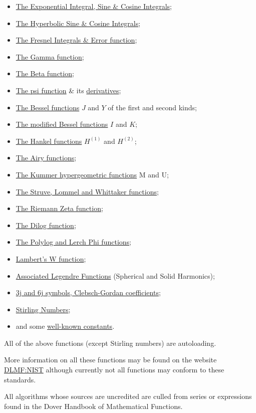 \begin{itemize}
\item \hyperlink{INTEGF}{The Exponential Integral, Sine \& Cosine Integrals};
\item \hyperlink{INTEGF}{The Hyperbolic Sine \& Cosine Integrals};
\item \hyperlink{INTEGF}{The Fresnel Integrals \& Error function};
\item \hyperlink{GAMMF}{The Gamma function};
\item \hyperlink{BETAF}{The Beta function};
\item \hyperlink{DIGAM}{The psi function} \& its \hyperlink{POLYGAM}{derivatives};
\item \hyperlink{BESSELF}{The Bessel functions} $J$ and $Y$ of the first and second kinds;
\item \hyperlink{BESSELF}{The modified Bessel functions} $I$ and $K$;
\item \hyperlink{BESSELF}{The Hankel functions} $H^{(1)}$ and $H^{(2)}$;
\item \hyperlink{AIRYF}{The Airy functions};
\item \hyperlink{HYPERGEOM}{The Kummer hypergeometric functions} M and U;
\item \hyperlink{HYPERGEOM}{The Struve, Lommel and Whittaker functions};
\item \hyperlink{RIEMZETA}{The Riemann Zeta function};
\item \hyperlink{POLYLOG}{The Dilog function};
\item \hyperlink{POLYLOG}{The Polylog and Lerch Phi functions};
\item \hyperlink{LAMBERTW}{Lambert's W function};
\item \hyperlink{SPHSOLH}{Associated Legendre Functions}
(Spherical and Solid Harmonics);
\item \hyperlink{CLEBSCHG}{3j and 6j symbols, Clebsch-Gordan coefficients};
\item \hyperlink{STIRL}{Stirling Numbers};
\item and some \hyperlink{CONSTS}{well-known constants}.
\end{itemize}

All of the above functions (except Stirling numbers) are autoloading.

More information on all these functions may be found on the website
\href{https://dlmf.nist.gov/}{DLMF:NIST} although currently not all functions
may conform to these standards.

All algorithms whose sources are uncredited are culled from series or
expressions found in the Dover Handbook of Mathematical
Functions\cite{AbramowitzStegun:72}.

